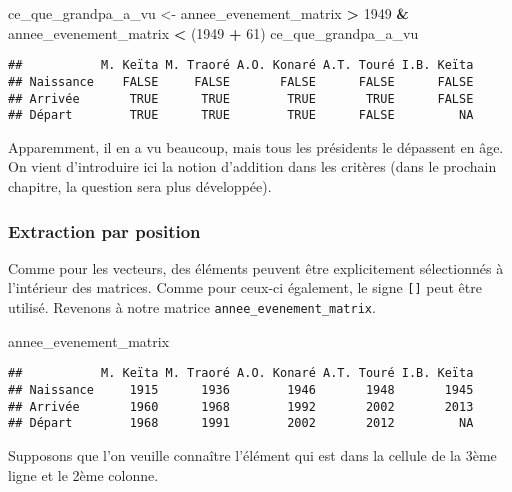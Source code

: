 \documentclass[]{book}
\newenvironment{Shaded}{\begin{snugshade}}{\end{snugshade}}
\newcommand{\DecValTok}[1]{\textcolor[rgb]{0.00,0.00,0.81}{#1}}
\newcommand{\StringTok}[1]{\textcolor[rgb]{0.31,0.60,0.02}{#1}}
\newcommand{\OperatorTok}[1]{\textcolor[rgb]{0.81,0.36,0.00}{\textbf{#1}}}
\newcommand{\NormalTok}[1]{#1}
\begin{document}
\begin{Shaded}
\begin{Highlighting}[]
\NormalTok{ce_que_grandpa_a_vu <-}\StringTok{ }\NormalTok{annee_evenement_matrix }\OperatorTok{>}\StringTok{ }\DecValTok{1949} \OperatorTok{&}\StringTok{ }\NormalTok{annee_evenement_matrix }\OperatorTok{<}\StringTok{ }\NormalTok{(}\DecValTok{1949} \OperatorTok{+}\StringTok{ }\DecValTok{61}\NormalTok{)}
\NormalTok{ce_que_grandpa_a_vu}
\end{Highlighting}
\end{Shaded}

\begin{verbatim}
##           M. Keïta M. Traoré A.O. Konaré A.T. Touré I.B. Keïta
## Naissance    FALSE     FALSE       FALSE      FALSE      FALSE
## Arrivée       TRUE      TRUE        TRUE       TRUE      FALSE
## Départ        TRUE      TRUE        TRUE      FALSE         NA
\end{verbatim}

Apparemment, il en a vu beaucoup, mais tous les présidents le dépassent
en âge. On vient d'introduire ici la notion d'addition dans les critères
(dans le prochain chapitre, la question sera plus développée).

\subsubsection{Extraction par position}\label{extraction-par-position}

Comme pour les vecteurs, des éléments peuvent être explicitement
sélectionnés à l'intérieur des matrices. Comme pour ceux-ci également,
le signe \texttt{{[}{]}} peut être utilisé. Revenons à notre matrice
\texttt{annee\_evenement\_matrix}.

\begin{Shaded}
\begin{Highlighting}[]
\NormalTok{annee_evenement_matrix}
\end{Highlighting}
\end{Shaded}

\begin{verbatim}
##           M. Keïta M. Traoré A.O. Konaré A.T. Touré I.B. Keïta
## Naissance     1915      1936        1946       1948       1945
## Arrivée       1960      1968        1992       2002       2013
## Départ        1968      1991        2002       2012         NA
\end{verbatim}

Supposons que l'on veuille connaître l'élément qui est dans la cellule
de la 3ème ligne et le 2ème colonne.
\end{document}

